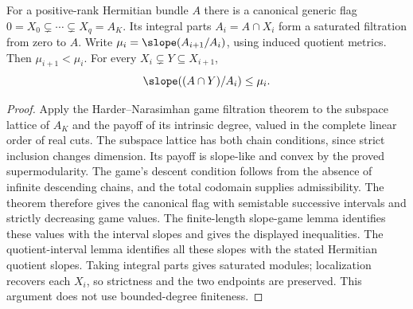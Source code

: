 \begin{lemma}
\label{lem:hermitian-hn-interval-flag}
\leanok
For a positive-rank Hermitian bundle $A$ there is a canonical generic
flag $0=X_0\subsetneq\cdots\subsetneq X_q=A_K$. Its integral parts
$A_i=A\cap X_i$ form a saturated filtration from zero to $A$.
Write $\mu_i=\slope(A_{i+1}/A_i)$, using induced quotient metrics.
Then $\mu_{i+1}<\mu_i$. For every $X_i\subsetneq Y\subseteq X_{i+1}$,
\[
 \slope((A\cap Y)/A_i)\leq\mu_i.
\]
\end{lemma}
\begin{proof}
Apply the Harder--Narasimhan game filtration theorem to the subspace
lattice of $A_K$ and the payoff of its intrinsic degree, valued in the
complete linear order of real cuts. The subspace lattice has both chain
conditions, since strict inclusion changes dimension. Its payoff is
slope-like and convex by the proved supermodularity. The game's descent
condition follows from the absence of infinite descending chains, and
the total codomain supplies admissibility. The theorem therefore gives
the canonical flag with semistable successive intervals and strictly
decreasing game values. The finite-length slope-game lemma identifies
these values with the interval slopes and gives the displayed inequalities.
The quotient-interval lemma identifies all these slopes with the stated
Hermitian quotient slopes. Taking integral parts gives saturated modules;
localization recovers each $X_i$, so strictness and the two endpoints are
preserved. This argument does not use bounded-degree finiteness.
\end{proof}

